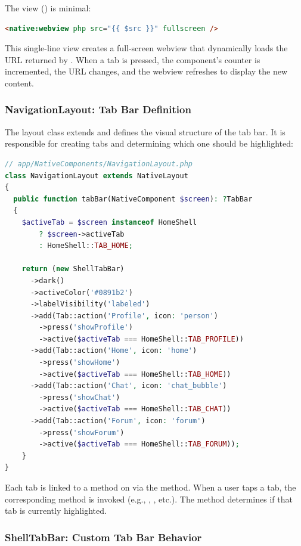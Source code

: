 The view () is minimal:

\begin{lstlisting}[language=html]
<native:webview php src="{{ $src }}" fullscreen />
\end{lstlisting}

\noindent This single-line view creates a full-screen webview that dynamically loads the URL
returned by . When a tab is pressed, the component's  counter is
incremented, the URL changes, and the webview refreshes to display the new content.

\subsubsection{NavigationLayout: Tab Bar Definition}

The layout class extends  and defines the visual structure of the tab bar. It is
responsible for creating tabs and determining which one should be highlighted:

\begin{lstlisting}[language=php]
// app/NativeComponents/NavigationLayout.php
class NavigationLayout extends NativeLayout
{
  public function tabBar(NativeComponent $screen): ?TabBar
  {
    $activeTab = $screen instanceof HomeShell
        ? $screen->activeTab
        : HomeShell::TAB_HOME;

    return (new ShellTabBar)
      ->dark()
      ->activeColor('#0891b2')
      ->labelVisibility('labeled')
      ->add(Tab::action('Profile', icon: 'person')
        ->press('showProfile')
        ->active($activeTab === HomeShell::TAB_PROFILE))
      ->add(Tab::action('Home', icon: 'home')
        ->press('showHome')
        ->active($activeTab === HomeShell::TAB_HOME))
      ->add(Tab::action('Chat', icon: 'chat_bubble')
        ->press('showChat')
        ->active($activeTab === HomeShell::TAB_CHAT))
      ->add(Tab::action('Forum', icon: 'forum')
        ->press('showForum')
        ->active($activeTab === HomeShell::TAB_FORUM));
    }
}
\end{lstlisting}

\noindent Each tab is linked to a method on  via the  method. When a
user taps a tab, the corresponding method is invoked (e.g., , ,
etc.). The  method determines if that tab is currently highlighted.

\subsubsection{ShellTabBar: Custom Tab Bar Behavior}

